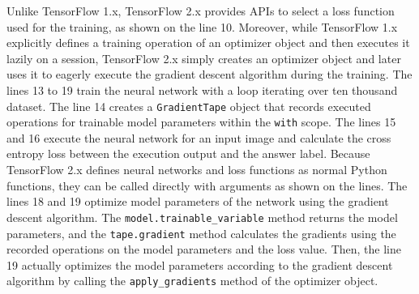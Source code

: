 Unlike TensorFlow 1.x, TensorFlow 2.x provides APIs to select a loss function
used for the training, as shown on the line 10.
Moreover, while TensorFlow 1.x explicitly defines a training operation of an
optimizer object and then executes it lazily on a session, TensorFlow 2.x
simply creates an optimizer object and later uses it to eagerly execute the
gradient descent algorithm during the training.
The lines 13 to 19 train the neural network with a loop iterating over ten
thousand dataset.
The line 14 creates a {\tt GradientTape} object that records executed
operations for trainable model parameters within the {\tt with} scope.  
The lines 15 and 16 execute the neural network for an input image and calculate
the cross entropy loss between the execution output and the answer label. 
Because TensorFlow 2.x defines neural networks and loss functions as normal
Python functions, they can be called directly with arguments as shown on the
lines.
The lines 18 and 19 optimize model parameters of the network using the gradient
descent algorithm. 
The {\tt model.trainable\_variable} method returns the model parameters, and
the {\tt tape.gradient} method calculates the gradients using the recorded
operations on the model parameters and the loss value.
Then, the line 19 actually optimizes the model parameters according to the
gradient descent algorithm by calling the {\tt apply\_gradients} method of the
optimizer object.

